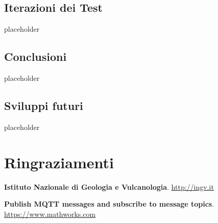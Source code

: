 \documentclass[a4paper,10pt]{memoir}
\begin{document}
\section{Iterazioni dei Test}

placeholder

\clearpage

\section{Conclusioni}

placeholder

\clearpage

\section{Sviluppi futuri}

placeholder

\clearpage


\chapter*{Ringraziamenti}

\cleardoublepage


\begin{thebibliography}{9}

  \textbf{Istituto Nazionale di Geologia e Vulcanologia}.
  \href{http://ingv.it}{http://ingv.it}

  \textbf{Publish MQTT messages and subscribe to message topics}.\\
  \href{https://www.mathworks.com/help/supportpkg/raspberrypi/ref/publish-and-subscribe-to-mqtt-messages.html}{https://www.mathworks.com}

\end{thebibliography}
\end{document}
